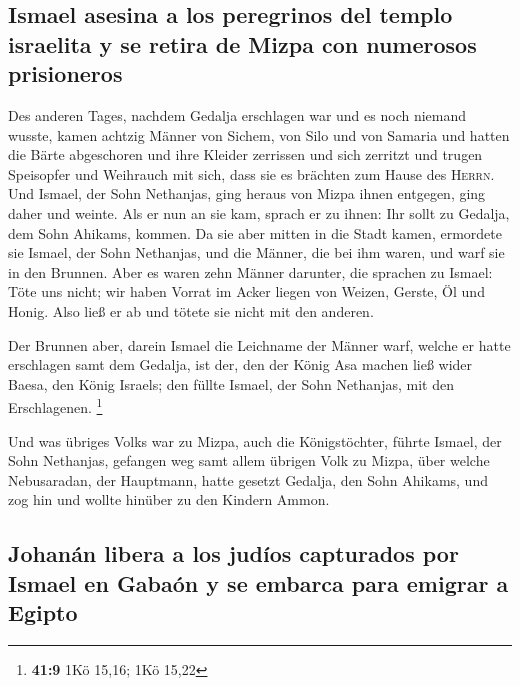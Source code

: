 \hypertarget{ismael-asesina-a-los-peregrinos-del-templo-israelita-y-se-retira-de-mizpa-con-numerosos-prisioneros}{%
\subsection{Ismael asesina a los peregrinos del templo israelita y se
retira de Mizpa con numerosos
prisioneros}\label{ismael-asesina-a-los-peregrinos-del-templo-israelita-y-se-retira-de-mizpa-con-numerosos-prisioneros}}

 Des anderen Tages, nachdem Gedalja erschlagen war und es
noch niemand wusste,  kamen achtzig Männer von Sichem, von
Silo und von Samaria und hatten die Bärte abgeschoren und ihre Kleider
zerrissen und sich zerritzt und trugen Speisopfer und Weihrauch mit
sich, dass sie es brächten zum Hause des \textsc{Herrn}. 
Und Ismael, der Sohn Nethanjas, ging heraus von Mizpa ihnen entgegen,
ging daher und weinte. Als er nun an sie kam, sprach er zu ihnen: Ihr
sollt zu Gedalja, dem Sohn Ahikams, kommen.  Da sie aber
mitten in die Stadt kamen, ermordete sie Ismael, der Sohn Nethanjas, und
die Männer, die bei ihm waren, und warf sie in den Brunnen.
 Aber es waren zehn Männer darunter, die sprachen zu
Ismael: Töte uns nicht; wir haben Vorrat im Acker liegen von Weizen,
Gerste, Öl und Honig. Also ließ er ab und tötete sie nicht mit den
anderen.

 Der Brunnen aber, darein Ismael die Leichname der Männer
warf, welche er hatte erschlagen samt dem Gedalja, ist der, den der
König Asa machen ließ wider Baesa, den König Israels; den füllte Ismael,
der Sohn Nethanjas, mit den Erschlagenen. \footnote{\textbf{41:9} 1Kö
  15,16; 1Kö 15,22}

 Und was übriges Volks war zu Mizpa, auch die
Königstöchter, führte Ismael, der Sohn Nethanjas, gefangen weg samt
allem übrigen Volk zu Mizpa, über welche Nebusaradan, der Hauptmann,
hatte gesetzt Gedalja, den Sohn Ahikams, und zog hin und wollte hinüber
zu den Kindern Ammon.

\hypertarget{johanuxe1n-libera-a-los-juduxedos-capturados-por-ismael-en-gabauxf3n-y-se-embarca-para-emigrar-a-egipto}{%
\subsection{Johanán libera a los judíos capturados por Ismael en Gabaón
y se embarca para emigrar a
Egipto}\label{johanuxe1n-libera-a-los-juduxedos-capturados-por-ismael-en-gabauxf3n-y-se-embarca-para-emigrar-a-egipto}}

